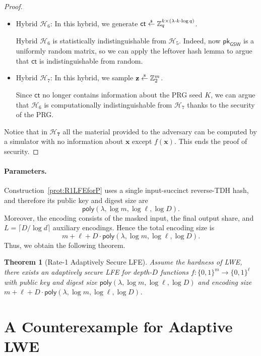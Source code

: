 \documentclass{article}
\newtheorem{theorem}{Theorem}\newtheorem{lemma}[theorem]{Lemma}\newtheorem{proposition}[theorem]{Proposition}\newtheorem{corollary}[theorem]{Corollary}\newtheorem{definition}[theorem]{Definition}\newtheorem{claim}[theorem]{Claim}
\newcommand{\getsr}{\overset{\raisebox{-1pt}{$\scriptscriptstyle \$$}}{\gets}}
\newcommand{\sample}{\getsr}
\newcommand{\Z}{\mathbb{Z}}
\newcommand{\poly}{\mathsf{poly}}
\renewcommand{\sec}{\ensuremath{\lambda}}
\newcommand{\ct}{\mathsf{ct}}
\newcommand{\BV}{\mathsf{GSW}}
\newcommand{\pk}{{\mathsf{pk}}}
\begin{document}
\begin{proof}
\begin{itemize}
\item Hybrid ${\mathcal{H}_6}$: In this hybrid, we generate $\ct\sample\Z_q^{k\times (\sec\cdot k\cdot \log q)}$.


Hybrid ${\mathcal{H}_6}$ is statistically indistinguishable from ${\mathcal{H}_5}$. Indeed, now $\pk_\BV$ is a uniformly random matrix, so we can apply the leftover hash lemma to argue that $\ct$ is indistinguishable from random.

\item Hybrid ${\mathcal{H}_7}$: In this hybrid, we sample $\mathbf{z}\sample\Z_2^{m}$.


Since $\ct$ no longer contains information about the PRG seed $K$, we can argue that ${\mathcal{H}_6}$ is computationally indistinguishable from ${\mathcal{H}_7}$ thanks to the security of the PRG.
\end{itemize}

 Notice that in $\mathbf{\mathcal{H}_7}$ all the material provided to the adversary can be computed by a simulator with no information about $\mathbf{x}$ except $f(\mathbf{x})$. This ends the proof of security.
\end{proof}

{\paragraph{Parameters.} Construction~\ref{prot:R1LFEforP}
uses a single input-succinct reverse-TDH hash, and therefore its public key and digest
size are
\[
\poly(\lambda,\log m,\log \ell,\log D).
\]
Moreover, the encoding consists of the masked input, the final output share,
and $L=\lceil D/\log d\rceil$ auxiliary encodings. Hence the total encoding
size is
\[
m+\ell+D\cdot \poly(\lambda,\log m,\log \ell,\log D).
\]
Thus, we obtain the following theorem.}

{

\begin{theorem}[Rate-1 Adaptively Secure LFE]
Assume the hardness of LWE, there exists an adaptively secure LFE for
depth-$D$ functions
$f:\{0,1\}^m\to\{0,1\}^\ell$
with public key and digest size $\poly(\lambda,\log m,\log \ell,\log D)$
and encoding size
$m+\ell+D\cdot \poly(\lambda,\log m,\log \ell,\log D)$.
\end{theorem}}

\section{A Counterexample for Adaptive LWE}\label{sec:counter}
\end{document}
